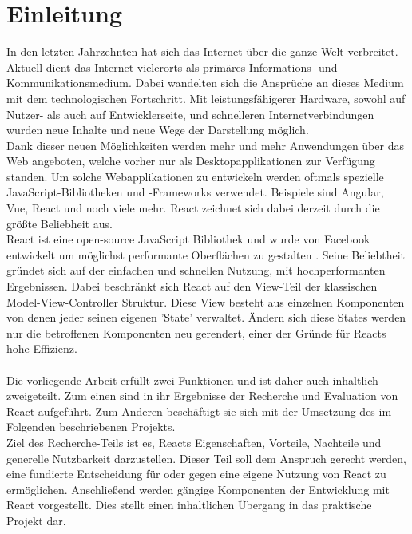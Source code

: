 
\chapter{Einleitung}\label{Einleitung}
In den letzten Jahrzehnten hat sich das Internet über die ganze Welt verbreitet. Aktuell dient das Internet vielerorts als primäres Informations- und Kommunikationsmedium. Dabei wandelten sich die Ansprüche an dieses Medium mit dem technologischen Fortschritt. Mit leistungsfähigerer Hardware, sowohl auf Nutzer- als auch auf Entwicklerseite, und schnelleren Internetverbindungen wurden neue Inhalte und neue Wege der Darstellung möglich.\\
Dank dieser neuen Möglichkeiten werden mehr und mehr Anwendungen über das Web angeboten, welche vorher nur als Desktopapplikationen zur Verfügung standen. Um solche Webapplikationen zu entwickeln werden oftmals spezielle JavaScript-Bibliotheken und -Frameworks verwendet. Beispiele sind Angular, Vue, React und noch viele mehr. React zeichnet sich dabei derzeit durch die größte Beliebheit aus.\\
React ist eine open-source JavaScript Bibliothek und wurde von Facebook entwickelt um möglichst performante Oberflächen zu gestalten \cite{1}. Seine Beliebtheit gründet sich auf der einfachen und schnellen Nutzung, mit hochperformanten Ergebnissen. Dabei beschränkt sich React auf den View-Teil der klassischen Model-View-Controller Struktur. Diese View besteht aus einzelnen Komponenten von denen jeder seinen eigenen 'State' verwaltet. Ändern sich diese States werden nur die betroffenen Komponenten neu gerendert, einer der Gründe für Reacts hohe Effizienz.\\\\
Die vorliegende Arbeit erfüllt zwei Funktionen und ist daher auch inhaltlich zweigeteilt. Zum einen sind in ihr Ergebnisse der Recherche und Evaluation von React aufgeführt. Zum Anderen beschäftigt sie sich mit der Umsetzung des im Folgenden beschriebenen Projekts. \\
Ziel des Recherche-Teils ist es, Reacts Eigenschaften, Vorteile, Nachteile und generelle Nutzbarkeit darzustellen. Dieser Teil soll dem Anspruch gerecht werden, eine fundierte Entscheidung für oder gegen eine eigene Nutzung von React zu ermöglichen. Anschließend werden gängige Komponenten der Entwicklung mit React vorgestellt. Dies stellt einen inhaltlichen Übergang in das praktische Projekt dar.\\\\
